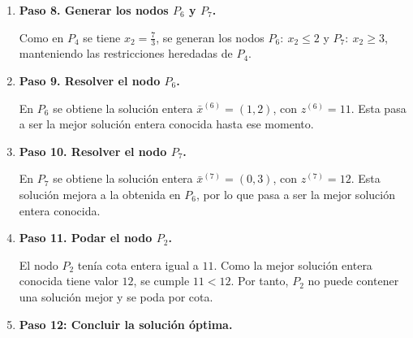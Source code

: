 \begin{enumerate}[label=\alph*)]
\begin{enumerate}
\item \textbf{Paso 8. Generar los nodos $P_6$ y $P_7$.}

Como en $P_4$ se tiene $x_2=\frac{7}{3}$, se generan los nodos $P_6:\ x_2\leq 2$ y $P_7:\ x_2\geq 3$, manteniendo las restricciones heredadas de $P_4$.

\item \textbf{Paso 9. Resolver el nodo $P_6$.}

En $P_6$ se obtiene la solución entera $\bar{x}^{(6)}=(1,2)$, con $z^{(6)}=11$. Esta pasa a ser la mejor solución entera conocida hasta ese momento.

\begin{center}
\end{center}

\item \textbf{Paso 10. Resolver el nodo $P_7$.}

En $P_7$ se obtiene la solución entera $\bar{x}^{(7)}=(0,3)$, con $z^{(7)}=12$. Esta solución mejora a la obtenida en $P_6$, por lo que pasa a ser la mejor solución entera conocida.

\begin{center}
\end{center}

\item \textbf{Paso 11. Podar el nodo $P_2$.}

El nodo $P_2$ tenía cota entera igual a $11$. Como la mejor solución entera conocida tiene valor $12$, se cumple $11<12$. Por tanto, $P_2$ no puede contener una solución mejor y se poda por cota.

\item \textbf{Paso 12: Concluir la solución óptima.}


\end{enumerate}
\end{enumerate}
